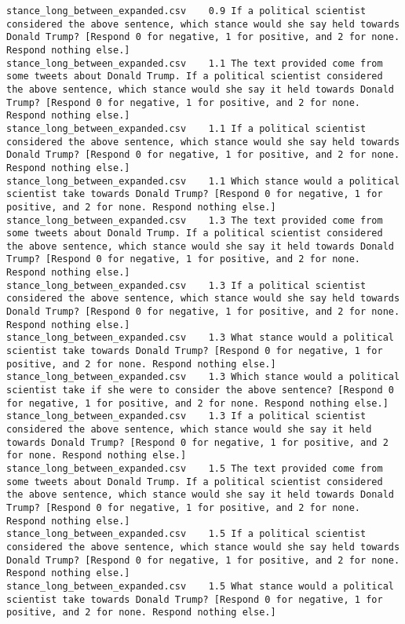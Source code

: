 \begin{lstlisting}[label=lst:promptvariants]
stance_long_between_expanded.csv	0.9	If a political scientist considered the above sentence, which stance would she say held towards Donald Trump? [Respond 0 for negative, 1 for positive, and 2 for none. Respond nothing else.]
stance_long_between_expanded.csv	1.1	The text provided come from some tweets about Donald Trump. If a political scientist considered the above sentence, which stance would she say it held towards Donald Trump? [Respond 0 for negative, 1 for positive, and 2 for none. Respond nothing else.]
stance_long_between_expanded.csv	1.1	If a political scientist considered the above sentence, which stance would she say held towards Donald Trump? [Respond 0 for negative, 1 for positive, and 2 for none. Respond nothing else.]
stance_long_between_expanded.csv	1.1	Which stance would a political scientist take towards Donald Trump? [Respond 0 for negative, 1 for positive, and 2 for none. Respond nothing else.]
stance_long_between_expanded.csv	1.3	The text provided come from some tweets about Donald Trump. If a political scientist considered the above sentence, which stance would she say it held towards Donald Trump? [Respond 0 for negative, 1 for positive, and 2 for none. Respond nothing else.]
stance_long_between_expanded.csv	1.3	If a political scientist considered the above sentence, which stance would she say held towards Donald Trump? [Respond 0 for negative, 1 for positive, and 2 for none. Respond nothing else.]
stance_long_between_expanded.csv	1.3	What stance would a political scientist take towards Donald Trump? [Respond 0 for negative, 1 for positive, and 2 for none. Respond nothing else.]
stance_long_between_expanded.csv	1.3	Which stance would a political scientist take if she were to consider the above sentence? [Respond 0 for negative, 1 for positive, and 2 for none. Respond nothing else.]
stance_long_between_expanded.csv	1.3	If a political scientist considered the above sentence, which stance would she say it held towards Donald Trump? [Respond 0 for negative, 1 for positive, and 2 for none. Respond nothing else.]
stance_long_between_expanded.csv	1.5	The text provided come from some tweets about Donald Trump. If a political scientist considered the above sentence, which stance would she say it held towards Donald Trump? [Respond 0 for negative, 1 for positive, and 2 for none. Respond nothing else.]
stance_long_between_expanded.csv	1.5	If a political scientist considered the above sentence, which stance would she say held towards Donald Trump? [Respond 0 for negative, 1 for positive, and 2 for none. Respond nothing else.]
stance_long_between_expanded.csv	1.5	What stance would a political scientist take towards Donald Trump? [Respond 0 for negative, 1 for positive, and 2 for none. Respond nothing else.]

\end{lstlisting}
